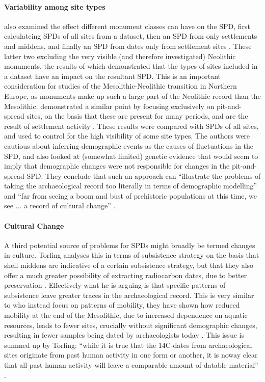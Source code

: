 \paragraph{Variability among site types}
\citet{Torfing2015193} also examined the effect different monument classes can have on the SPD, first calculateing SPDs of all sites from a dataset, then an SPD from only settlements and middens, and finally an SPD from dates only from settlement sites \citep[194]{Torfing2015193}. These latter two excluding the very visible (and therefore investigated) Neolithic monuments, the results of which demonstrated that the types of sites included in a dataset have an impact on the resultant SPD. This is an important consideration for studies of the Mesolithic-Neolithic transition in Northern Europe, as monuments make up such a large part of the Neolithic record than the Mesolithic. \citet{McLaughlin2016} demonstrated a similar point by focusing exclusively on pit-and-spread sites, on the basis that these are present for many periods, and are the result of settlement activity \citep[141]{McLaughlin2016}. These results were compared with SPDs of all sites, and used to control for the high visibility of some site types. The authors were cautious about inferring demographic events as the causes of fluctuations in the SPD, and also looked at (somewhat limited) genetic evidence \citep[142]{McLaughlin2016} that would seem to imply that demographic changes were not responsible for changes in the pit-and-spread SPD. They conclude that such an approach can ``illustrate the problems of taking the archaeological record too literally in terms of demographic modelling'' \citep[143]{McLaughlin2016} and ``far from seeing a boom and bust of prehistoric populations at this time, we see ... a record of cultural change'' \citep[144]{McLaughlin2016}.

\paragraph{Cultural Change}
A third potential source of problems for SPDs might broadly be termed changes in culture. Torfing analyses this in terms of subsistence strategy on the basis that shell middens are indicative of a certain subsistence strategy, but that they also offer a much greater possibility of extracting radiocarbon dates, due to better preservation \citep[196]{Torfing2015193}. Effectively what he is arguing is that specific patterns of subsistence leave greater traces in the archaeological record. This is very similar to \citet{CROMBE2014558} who instead focus on patterns of mobility, they have shown how reduced mobility at the end of the Mesolithic, due to increased dependence on aquatic resources, leads to fewer sites, crucially without significant demographic changes, resulting in fewer samples being dated by archaeologists today \citep[560]{CROMBE2014558}. This issue is summed up by Torfing: ``while it is true that the 14C-dates from archaeological sites originate from past human activity in one form or another, it is noway clear that all past human activity will leave a comparable amount of datable material''  \citep[193]{Torfing2015193}.

